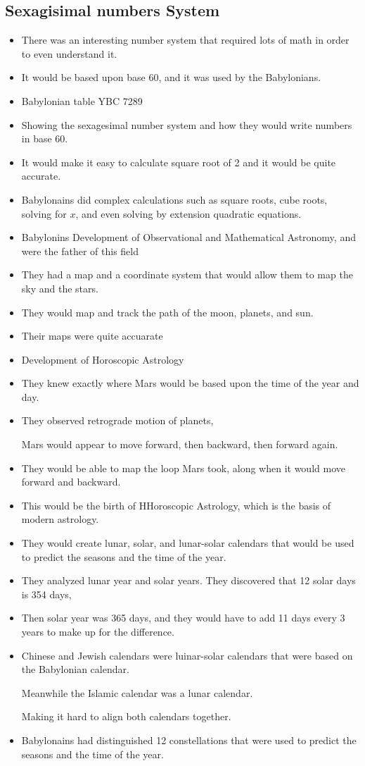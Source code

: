\documentclass{article}
\begin{document}
\subsection{Sexagisimal numbers System}
\begin{itemize}
  \item There was an interesting number
    system that required lots of math in order
    to even understand it.
  \item It would be based upon base 60, and it was
    used by the Babylonians.
\end{itemize}

\begin{itemize}
  \item Babylonian table YBC 7289
  \item Showing the sexagesimal number system
    and how they would write numbers in base 60.
  \item It would make it easy to calculate square root of 2 and
    it would be quite accurate.
  \item Babylonains did complex calculations such as
    square roots, cube roots, solving for $x$, and even solving by extension quadratic equations.
  \item Babylonins Development of Observational and Mathematical Astronomy,
    and were the father of this field
  \item They had a map and a coordinate system
    that would allow them to map the sky and the stars.
  \item They would map and track the path of the moon, planets, and sun.
  \item Their maps were quite accuarate
  \item Development of Horoscopic Astrology
  \item They knew exactly where Mars would be based upon the time of the year
    and day.
  \item They observed retrograde motion of planets,

    Mars would appear to move forward, then backward, then forward again.
  \item They would be able to map the loop Mars took, along when it would move forward and backward.
  \item This would be the birth of HHoroscopic Astrology,
    which is the basis of modern astrology.
  \item They would create lunar, solar, and lunar-solar calendars
    that would be used to predict the seasons and the time of the year.
  \item They analyzed lunar year and solar years.
    They discovered that 12 solar days is 354 days,
  \item Then solar year was 365 days, and they would
    have to add 11 days every 3 years to make up for the difference.
  \item Chinese and Jewish calendars were luinar-solar calendars
    that were based on the Babylonian calendar.

    Meanwhile the Islamic calendar was a lunar calendar.

    Making it hard to align both calendars together.
  \item Babylonains had distinguished 12 constellations
    that were used to predict the seasons and the time of the year.
\end{itemize}
\end{document}
